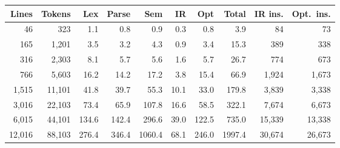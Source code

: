 \begin{tabular}{rrrrrrrrrr}
\toprule
\textbf{Lines} & \textbf{Tokens} & \textbf{Lex} & \textbf{Parse} & \textbf{Sem} & \textbf{IR} & \textbf{Opt} & \textbf{Total} & \textbf{IR ins.} & \textbf{Opt.\ ins.}\\
\midrule
46 & 323 & 1.1 & 0.8 & 0.9 & 0.3 & 0.8 & 3.9 & 84 & 73\\
165 & 1{,}201 & 3.5 & 3.2 & 4.3 & 0.9 & 3.4 & 15.3 & 389 & 338\\
316 & 2{,}303 & 8.1 & 5.7 & 5.6 & 1.6 & 5.7 & 26.7 & 774 & 673\\
766 & 5{,}603 & 16.2 & 14.2 & 17.2 & 3.8 & 15.4 & 66.9 & 1{,}924 & 1{,}673\\
1{,}515 & 11{,}101 & 41.8 & 39.7 & 55.3 & 10.1 & 33.0 & 179.8 & 3{,}839 & 3{,}338\\
3{,}016 & 22{,}103 & 73.4 & 65.9 & 107.8 & 16.6 & 58.5 & 322.1 & 7{,}674 & 6{,}673\\
6{,}015 & 44{,}101 & 134.6 & 142.4 & 296.6 & 39.0 & 122.5 & 735.0 & 15{,}339 & 13{,}338\\
12{,}016 & 88{,}103 & 276.4 & 346.4 & 1060.4 & 68.1 & 246.0 & 1997.4 & 30{,}674 & 26{,}673\\\bottomrule
\end{tabular}
